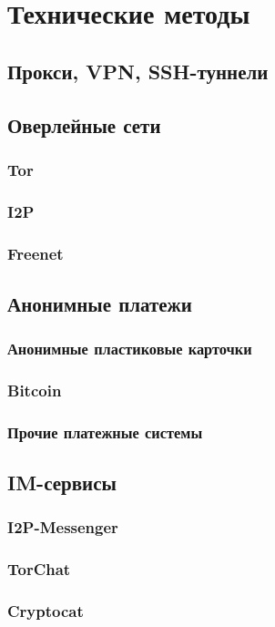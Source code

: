 \chapter{Технические методы}
\section{Прокси, VPN, SSH-туннели}

\section{Оверлейные сети}
\subsection{Tor}
\subsection{I2P}
\subsection{Freenet}

\section{Анонимные платежи}
\subsection{Анонимные пластиковые карточки}
\subsection{Bitcoin}
\subsection{Прочие платежные системы}

\section{IM-сервисы}
\subsection{I2P-Messenger}
\subsection{TorChat}
\subsection{Cryptocat}

